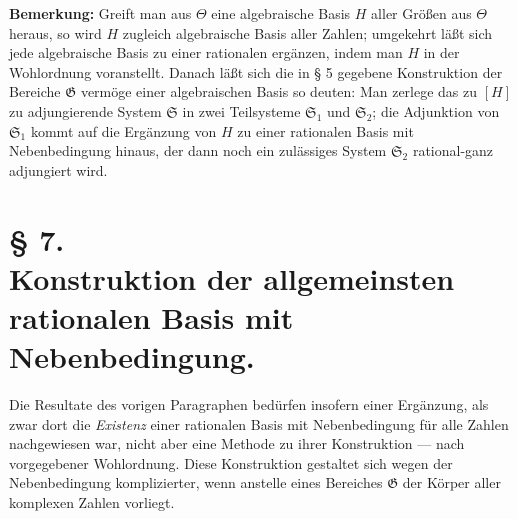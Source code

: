 \textbf{Bemerkung:} Greift man aus $\Theta$ eine algebraische Basis $H$ aller
Größen aus $\Theta$ heraus, so wird $H$ zugleich algebraische Basis aller Zahlen;
umgekehrt läßt sich jede algebraische Basis zu einer rationalen ergänzen, indem
man $H$ in der Wohlordnung voranstellt. Danach läßt sich die in § 5 gegebene
Konstruktion der Bereiche $\mathfrak G$ vermöge einer algebraischen Basis so
deuten: Man zerlege das zu $[H]$ zu adjungierende System $\mathfrak S$ in zwei
Teilsysteme $\mathfrak S_1$ und $\mathfrak S_2$; die Adjunktion von
$\mathfrak S_1$ kommt auf die Ergänzung von $H$ zu einer rationalen Basis mit
Nebenbedingung hinaus, der dann noch ein zulässiges System $\mathfrak S_2$
rational-ganz adjungiert wird.

\section*{\centering § 7.\\[0.35em]
Konstruktion der allgemeinsten rationalen Basis mit\\
Nebenbedingung.}

Die Resultate des vorigen Paragraphen bedürfen insofern einer Ergänzung, als
zwar dort die \emph{Existenz} einer rationalen Basis mit Nebenbedingung für alle
Zahlen nachgewiesen war, nicht aber eine Methode zu ihrer Konstruktion --- nach
vorgegebener Wohlordnung. Diese Konstruktion gestaltet sich wegen der
Nebenbedingung komplizierter, wenn anstelle eines Bereiches $\mathfrak G$ der
Körper aller komplexen Zahlen vorliegt.

